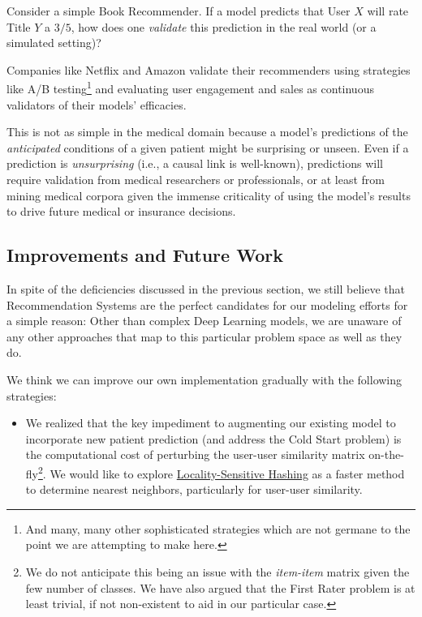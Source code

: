 \documentclass[twoside,11pt]{article}
\newcommand*\circled[1]{\tikz[baseline=(char.base)]{
            \node[shape=circle,draw,inner sep=1pt] (char) {#1};}}
\begin{document}
{Consider a simple Book Recommender. If a model predicts that User $X$ will rate Title $Y$ a $3/5$, how does one \textit{validate} this prediction in the real world (or a simulated setting)?

Companies like Netflix and Amazon validate their recommenders using strategies like A/B testing\footnote{And many, many other sophisticated strategies which are not germane to the point we are attempting to make here.} and evaluating user engagement and sales as continuous validators of their models' efficacies.

This is not as simple in the medical domain because a model's predictions of the \textit{anticipated} conditions of a given patient might be surprising or unseen. Even if a prediction is \textit{unsurprising} (i.e., a causal link is well-known), predictions will require validation \circled{1} from medical researchers or professionals, or at least \circled{2} from mining medical corpora given the immense criticality of using the model's results to drive future medical or insurance decisions.
\newpage
\subsection{Improvements and Future Work}

In spite of the deficiencies discussed in the previous section, we still believe that Recommendation Systems are the perfect candidates for our modeling efforts for a simple reason: Other than complex Deep Learning models, we are unaware of any other approaches that map to this particular problem space as well as they do.

We think we can improve our own implementation gradually with the following strategies:
\begin{itemize}

  \item We realized that the key impediment to augmenting our existing model to incorporate new patient prediction (and address the Cold Start problem) is the computational cost of perturbing the user-user similarity matrix on-the-fly\footnote{We do not anticipate this being an issue with the \textit{item-item} matrix given the few number of classes. We have also argued that the First Rater problem is at least trivial, if not non-existent to aid in our particular case.}. We would like to explore \href{https://en.wikipedia.org/wiki/Locality-sensitive_hashing}{Locality-Sensitive Hashing} as a faster method to determine nearest neighbors, particularly for user-user similarity.


\end{itemize}}
\end{document}

